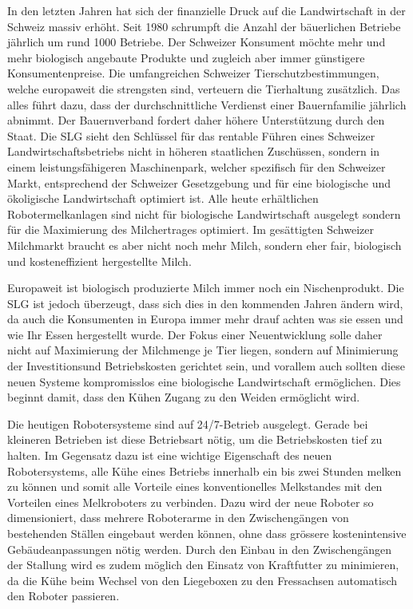 In den letzten Jahren hat sich der finanzielle Druck auf die Landwirtschaft in der Schweiz massiv erhöht. Seit 1980 schrumpft die Anzahl der bäuerlichen Betriebe jährlich um rund 1000 Betriebe. Der Schweizer Konsument möchte mehr und mehr biologisch angebaute Produkte und zugleich aber immer günstigere Konsumentenpreise. Die umfangreichen Schweizer Tierschutzbestimmungen, welche europaweit die strengsten sind, verteuern die Tierhaltung zusätzlich. Das alles führt dazu, dass der durchschnittliche Verdienst einer Bauernfamilie jährlich abnimmt. Der Bauernverband fordert daher höhere Unterstützung durch den Staat. Die SLG sieht den Schlüssel für das rentable Führen eines Schweizer Landwirtschaftsbetriebs nicht in höheren staatlichen Zuschüssen, sondern in einem leistungsfähigeren Maschinenpark, welcher spezifisch für den Schweizer Markt, entsprechend der Schweizer Gesetzgebung und für eine biologische und ökoligische Landwirtschaft optimiert ist. Alle heute erhältlichen Robotermelkanlagen sind nicht für biologische Landwirtschaft ausgelegt sondern für die Maximierung des Milchertrages optimiert. Im gesättigten Schweizer Milchmarkt braucht es aber nicht noch mehr Milch, sondern eher fair, biologisch und kosteneffizient hergestellte Milch.

Europaweit ist biologisch produzierte Milch immer noch ein Nischenprodukt. Die SLG ist jedoch überzeugt, dass sich dies in den kommenden Jahren ändern wird, da auch die Konsumenten in Europa immer mehr drauf achten was sie essen und wie Ihr Essen hergestellt wurde. Der Fokus einer Neuentwicklung solle daher nicht auf Maximierung der Milchmenge je Tier liegen, sondern auf Minimierung der Investitionsund Betriebskosten gerichtet sein, und vorallem auch sollten diese neuen Systeme kompromisslos eine biologische Landwirtschaft ermöglichen. Dies beginnt damit, dass den Kühen Zugang zu den Weiden ermöglicht wird.

Die heutigen Robotersysteme sind auf 24/7-Betrieb ausgelegt. Gerade bei kleineren Betrieben ist diese Betriebsart nötig, um die Betriebskosten tief zu halten. Im Gegensatz dazu ist eine wichtige Eigenschaft des neuen Robotersystems, alle Kühe eines Betriebs innerhalb ein bis zwei Stunden melken zu können und somit alle Vorteile eines konventionelles Melkstandes mit den Vorteilen eines Melkroboters zu verbinden. Dazu wird der neue Roboter so dimensioniert, dass mehrere Roboterarme in den Zwischengängen von bestehenden Ställen eingebaut werden können, ohne dass grössere kostenintensive Gebäudeanpassungen nötig werden. Durch den Einbau in den Zwischengängen der Stallung wird es zudem möglich den Einsatz von Kraftfutter zu minimieren, da die Kühe beim Wechsel von den Liegeboxen zu den Fressachsen automatisch den Roboter passieren.

